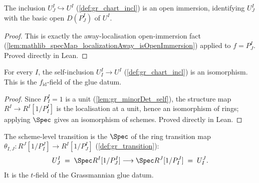 \begin{lemma}

  \label{lem:gr_chartIncl_isOpenImmersion}
  The inclusion \(U^I_J \hookrightarrow U^I\) (\cref{def:gr_chart_incl}) is an
  open immersion, identifying \(U^I_J\) with the basic open \(D(P^I_J)\) of
  \(U^I\).
\end{lemma}
\begin{proof}
  \leanok
  This is exactly the away-localisation open-immersion fact
  (\cref{lem:mathlib_specMap_localizationAway_isOpenImmersion}) applied to
  \(f = P^I_J\). Proved directly in Lean.
\end{proof}

\begin{lemma}

  \label{lem:gr_chartIncl_self_isIso}
  For every \(I\), the self-inclusion \(U^I_I \to U^I\) (\cref{def:gr_chart_incl})
  is an isomorphism. This is the \(f_{\mathrm{id}}\)-field of the glue datum.
\end{lemma}
\begin{proof}
  \leanok
  Since \(P^I_I = 1\) is a unit (\cref{lem:gr_minorDet_self}), the structure map
  \(R^I \to R^I[1/P^I_I]\) is the localisation at a unit, hence an isomorphism of
  rings; applying \(\Spec\) gives an isomorphism of schemes. Proved directly in
  Lean.
\end{proof}

\begin{definition}

  \label{def:gr_chart_transition}
  The scheme-level transition is the \(\Spec\) of the ring transition map
  \(\theta_{I,J} : R^J[1/P^J_I] \to R^I[1/P^I_J]\) (\cref{def:gr_transition}):
  \[
    U^I_J \;=\; \Spec R^I[1/P^I_J] \longrightarrow \Spec R^J[1/P^J_I] \;=\; U^J_I .
  \]
  It is the \(t\)-field of the Grassmannian glue datum.
\end{definition}

